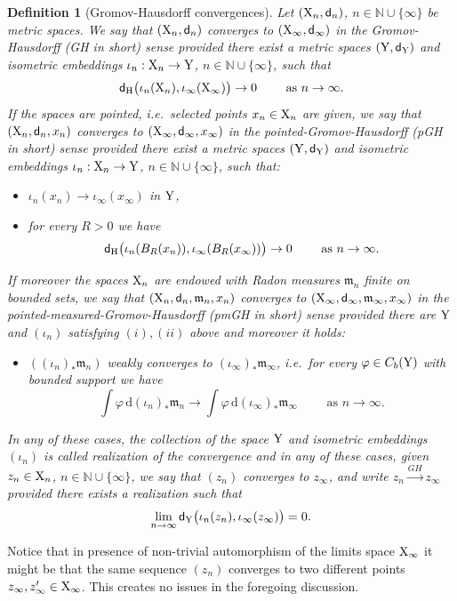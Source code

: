 \documentclass[reqno,11pt]{article}
\numberwithin{equation}{section}
\newcommand{\N}{\mathbb{N}}
\newcommand{\mm}{{\mbox{\boldmath$m$}}}
\newcommand{\sfd}{{\sf d}}
\renewcommand{\d}{{\mathrm d}}
\renewcommand{\mm}{\mathfrak m}                                %
\newtheorem{definition}[theorem]{Definition}
\newcommand{\X}{{\rm X}}
\newcommand{\Y}{{\rm Y}}
\begin{document}
\begin{definition}[Gromov-Hausdorff convergences]\label{def:GH}
Let $(\X_n,\sfd_n)$, $n\in\N\cup\{\infty\}$ be  metric spaces. We say that $(\X_n,\sfd_n)$ converges to $(\X_\infty,\sfd_\infty)$ in the Gromov-Hausdorff (GH in short) sense provided there exist a metric spaces $(\Y,\sfd_\Y)$ and isometric embeddings $\iota_n:\X_n\to\Y$, $n\in\N\cup\{\infty\}$, such that 
\[
\sfd_{\rm H}\big(\iota_n(\X_n),\iota_\infty(\X_\infty)\big)\to 0\qquad\text{ as }n\to\infty.
\]
If the spaces are pointed, i.e.\ selected points $x_n\in\X_n$ are given, we say that $(\X_n,\sfd_n,x_n)$ converges to $(\X_\infty,\sfd_\infty,x_\infty)$ in the pointed-Gromov-Hausdorff (pGH in short) sense provided there exist a metric spaces $(\Y,\sfd_\Y)$ and isometric embeddings $\iota_n:\X_n\to\Y$, $n\in\N\cup\{\infty\}$, such that:
\begin{itemize}
\item[i)] $\iota_n(x_n)\to\iota_\infty(x_\infty)$ in $\Y$,
\item[ii)] for every $R>0$ we have
\[
\sfd_{\rm H}\big(\iota_n(B_R(x_n)),\iota_\infty(B_R(x_\infty))\big)\to 0\qquad\text{ as }n\to\infty.
\]
\end{itemize}
If moreover  the spaces $\X_n$ are  endowed with Radon measures $\mm_n$ finite on bounded sets, we say that $(\X_n,\sfd_n,\mm_n,x_n)$ converges to $(\X_\infty,\sfd_\infty,\mm_\infty,x_\infty)$ in the pointed-measured-Gromov-Hausdorff (pmGH in short)  sense provided there are $\Y$ and $(\iota_n)$ satisfying $(i),(ii)$ above and moreover it holds:
\begin{itemize}
\item[iii)] $((\iota_n)_*\mm_n)$ weakly converges to $(\iota_\infty)_*\mm_\infty$, i.e.\ for every $\varphi\in C_b(\Y)$ with bounded support we have
\[
\int\varphi\,\d(\iota_n)_*\mm_n\to\int\varphi\,\d(\iota_\infty)_*\mm_\infty\qquad\text{ as }n\to\infty.
\]
\end{itemize}
In any of these cases, the collection of the space $\Y$ and isometric embeddings $(\iota_n)$ is called \emph{realization} of the convergence and in any of these cases, given $z_n\in\X_n$, $n\in\N\cup\{\infty\}$, we say that   $(z_n)$ converges to $z_\infty$, and write $z_n\stackrel{GH}\to z_\infty$ provided there exists a realization such that
\[
\lim_{n\to\infty}\sfd_\Y\big(\iota_n(z_n), \iota_\infty(z_\infty)\big)=0.
\]
\end{definition}
Notice that in presence of non-trivial automorphism of the limits space $\X_\infty$ it might be that the same sequence $(z_n)$ converges to two different points $z_\infty,z_\infty'\in\X_\infty$. This creates no issues in the foregoing discussion.
\end{document}
